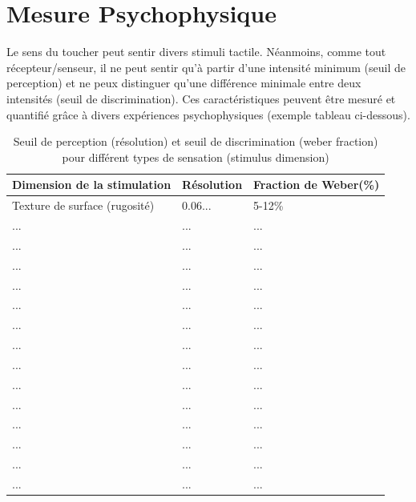 \section{Mesure Psychophysique}
Le sens du toucher peut sentir divers stimuli tactile. Néanmoins, comme tout récepteur/senseur, il ne peut sentir qu’à partir d’une intensité minimum (seuil de perception) et ne peux distinguer qu’une différence minimale entre deux intensités (seuil de discrimination). Ces caractéristiques peuvent être mesuré et quantifié grâce à divers expériences  psychophysiques (exemple tableau ci-dessous).\par
\begin{table}[!h]
	\caption{Seuil de perception (résolution) et seuil de discrimination (weber fraction) pour différent types de sensation (stimulus dimension)}
	\label{tab_mesure_psycho}
	\centering
	\begin{tabular}{|p{5cm}|p{5cm}|p{4cm}|}
		\hline \rule[-7pt]{0pt}{20pt}
		Dimension de la stimulation&Résolution&Fraction de Weber(\%)\\
		\hline
		\rule[-7pt]{0pt}{20pt}Texture de surface (rugosité)& 0.06... & 5-12\% \\
		\hline
		\rule[-7pt]{0pt}{20pt}...&...& ...\\
		\hline
		\rule[-7pt]{0pt}{20pt}...&...&...\\
		\hline 
		\rule[-7pt]{0pt}{20pt}...&...&...\\
		\hline
		\rule[-7pt]{0pt}{20pt}...&...& ...\\
		\hline
		\rule[-7pt]{0pt}{20pt}...&...&...\\
		\hline 
		\rule[-7pt]{0pt}{20pt}...&...&...\\
		\hline
		\rule[-7pt]{0pt}{20pt}...&...& ...\\
		\hline
		\rule[-7pt]{0pt}{20pt}...&...&...\\
		\hline 
		\rule[-7pt]{0pt}{20pt}...&...&...\\
		\hline
		\rule[-7pt]{0pt}{20pt}...&...& ...\\
		\hline
		\rule[-7pt]{0pt}{20pt}...&...&...\\
		\hline 
		\rule[-7pt]{0pt}{20pt}...&...&...\\
		\hline
		\rule[-7pt]{0pt}{20pt}...&...& ...\\
		\hline
		\rule[-7pt]{0pt}{20pt}...&...&...\\
		\hline
	\end{tabular}
\end{table}

